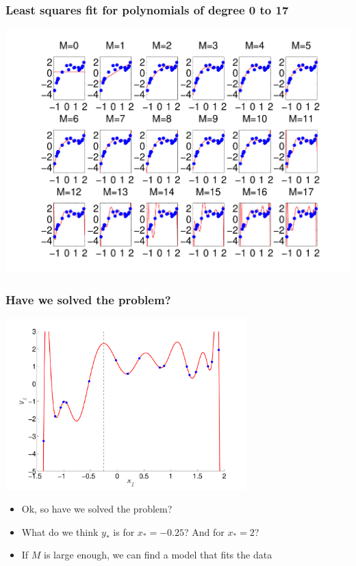 \documentclass[10pt]{beamer}
\begin{document}
\begin{frame}
\frametitle{Least squares fit for polynomials of degree 0 to 17}

\centerline{\includegraphics[width=\textwidth]{fitted_polynomials.pdf}}

\end{frame}
\begin{frame}
\frametitle{Have we solved the problem?}

\centerline{\includegraphics[width=0.7\textwidth]{toy_data_polynomial_overfit.pdf}}

\begin{itemize}
\item Ok, so have we solved the problem?
\item What do we think $y_*$ is for $x_*=-0.25$? And for $x_*=2$?
\item If $M$ is large enough, we can find a model that fits the data 
\end{itemize}


\end{frame}
\end{document}
